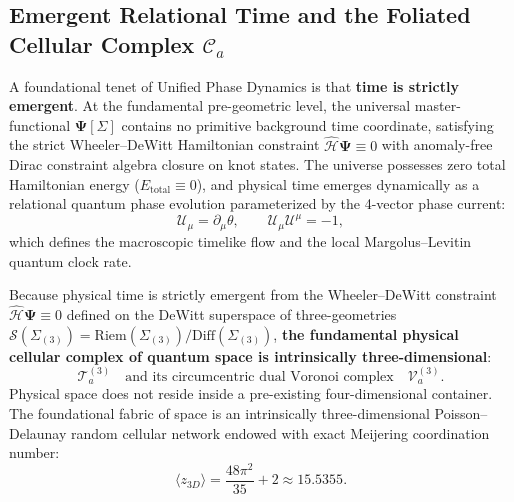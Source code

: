 \documentclass[11pt, a4paper]{article}
\theoremstyle{definition}
\theoremstyle{remark}
\begin{document}
\subsection{Emergent Relational Time and the Foliated Cellular Complex $\mathcal{C}_{a}$}

A foundational tenet of Unified Phase Dynamics is that \textbf{time is strictly emergent}. At the fundamental pre-geometric level, the universal master-functional $\mathbf{\Psi}[\Sigma]$ contains no primitive background time coordinate, satisfying the strict Wheeler--DeWitt Hamiltonian constraint $\hat{\mathcal{H}}\mathbf{\Psi} \equiv 0$ with anomaly-free Dirac constraint algebra closure on knot states. The universe possesses zero total Hamiltonian energy ($E_{\mathrm{total}} \equiv 0$), and physical time emerges dynamically as a relational quantum phase evolution parameterized by the 4-vector phase current:
\begin{equation}
  \mathcal{U}_{\mu} = \partial_{\mu}\theta, \qquad \mathcal{U}_{\mu}\mathcal{U}^{\mu} = -1,
\end{equation}
which defines the macroscopic timelike flow and the local Margolus--Levitin quantum clock rate.

Because physical time is strictly emergent from the Wheeler--DeWitt constraint $\hat{\mathcal{H}}\mathbf{\Psi} \equiv 0$ defined on the DeWitt superspace of three-geometries $\mathcal{S}(\Sigma_{(3)}) = \mathrm{Riem}(\Sigma_{(3)})/\mathrm{Diff}(\Sigma_{(3)})$, \textbf{the fundamental physical cellular complex of quantum space is intrinsically three-dimensional}:
\begin{equation}
  \mathcal{T}_{a}^{(3)} \quad \text{and its circumcentric dual Voronoi complex} \quad \mathcal{V}_{a}^{(3)}.
\end{equation}
Physical space does not reside inside a pre-existing four-dimensional container. The foundational fabric of space is an intrinsically three-dimensional Poisson--Delaunay random cellular network endowed with exact Meijering coordination number:
\begin{equation}
  \langle z_{3D} \rangle = \frac{48\pi^{2}}{35} + 2 \approx 15.5355.
\end{equation}
\end{document}
